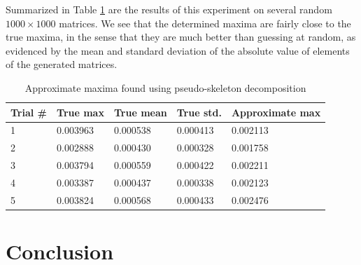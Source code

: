 \documentclass{article}
\begin{document}
	Summarized in Table \ref{table:approximate_maxima} are the results of this experiment on several random $1000\times1000$ matrices. We see that the determined maxima are fairly close to the true maxima, in the sense that they are much better than guessing at random, as evidenced by the mean and standard deviation of the absolute value of elements of the generated matrices.
	\begin{table}
		\centering
		\begin{tabular}{@{}lllll@{}}
			\toprule
			Trial \# & True max & True mean & True std. & Approximate max\\
			\midrule
			1 & 0.003963 & 0.000538 & 0.000413 & 0.002113\\
			2 & 0.002888 & 0.000430 & 0.000328 & 0.001758\\
			3 & 0.003794 & 0.000559 & 0.000422 & 0.002211\\
			4 & 0.003387 & 0.000437 & 0.000338 & 0.002123\\
			5 & 0.003824 & 0.000568 & 0.000433 & 0.002476\\
			\bottomrule
		\end{tabular}
		\caption{Approximate maxima found using pseudo-skeleton decomposition}
		\label{table:approximate_maxima}
	\end{table}
	
	\section{Conclusion}
	
	
	
\end{document}
